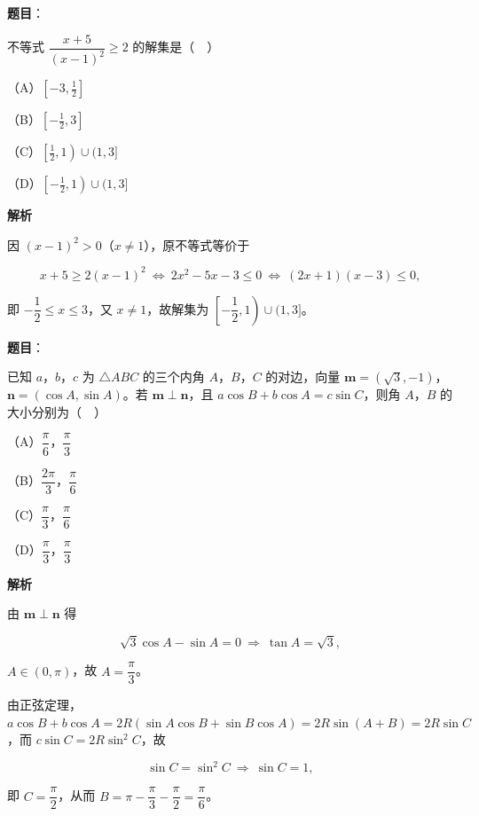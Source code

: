 \begin{answer}

\textbf{题目}：

不等式 $\dfrac{x+5}{(x-1)^2}\geqslant2$ 的解集是（　）

（A）$\left[-3,\frac12\right]$

（B）$\left[-\frac12,3\right]$

（C）$\left[\frac12,1\right)\cup(1,3]$

（D）$\left[-\frac12,1\right)\cup(1,3]$

\textbf{解析}

因 $(x-1)^2>0$（$x\neq1$），原不等式等价于

\nopagebreak[4]
\[x+5\geqslant2(x-1)^2\ \Longleftrightarrow\ 2x^2-5x-3\leqslant0\ \Longleftrightarrow\ (2x+1)(x-3)\leqslant0,\]

即 $-\dfrac12\leqslant x\leqslant3$，又 $x\neq1$，故解集为 $\left[-\dfrac12,1\right)\cup(1,3]$。


\end{answer}
\begin{answer}

\textbf{题目}：

已知 $a$，$b$，$c$ 为 $\triangle ABC$ 的三个内角 $A$，$B$，$C$ 的对边，向量 $\boldsymbol m=(\sqrt3,-1)$，$\boldsymbol n=(\cos A,\sin A)$。若 $\boldsymbol m\perp\boldsymbol n$，且 $a\cos B+b\cos A=c\sin C$，则角 $A$，$B$ 的大小分别为（　）

（A）$\dfrac{\pi}{6}$，$\dfrac{\pi}{3}$

（B）$\dfrac{2\pi}{3}$，$\dfrac{\pi}{6}$

（C）$\dfrac{\pi}{3}$，$\dfrac{\pi}{6}$

（D）$\dfrac{\pi}{3}$，$\dfrac{\pi}{3}$

\textbf{解析}

由 $\boldsymbol m\perp\boldsymbol n$ 得

\nopagebreak[4]
\[\sqrt3\cos A-\sin A=0\ \Longrightarrow\ \tan A=\sqrt3,\]

$A\in(0,\pi)$，故 $A=\dfrac{\pi}3$。

由正弦定理，$a\cos B+b\cos A=2R(\sin A\cos B+\sin B\cos A)=2R\sin(A+B)=2R\sin C$，而 $c\sin C=2R\sin^2C$，故

\nopagebreak[4]
\[\sin C=\sin^2C\ \Longrightarrow\ \sin C=1,\]

即 $C=\dfrac{\pi}2$，从而 $B=\pi-\dfrac{\pi}3-\dfrac{\pi}2=\dfrac{\pi}6$。


\end{answer}
